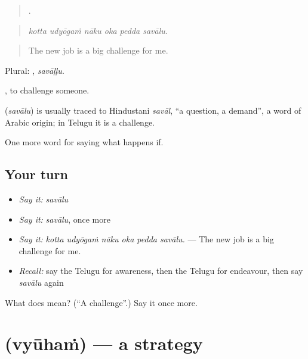 \begin{quote}
     .
\end{quote}

\begin{quote}
\emph{kotta udyōgaṁ nāku oka pedda savālu.}
\end{quote}

\begin{quote}
The new job is a big challenge for me.
\end{quote}

Plural: , \emph{savāḷḷu}.

 , to challenge someone.

\begin{cousinweb}
\textbf{} (\emph{savālu}) is usually traced to Hindustani \emph{savāl}, \textquotedblleft{}a question, a demand\textquotedblright{}, a word of Arabic origin; in Telugu it is a challenge.
\end{cousinweb}

\begin{grammarlens}[title={What you've built}]
One more word for saying what happens if.
\end{grammarlens}

\subsection*{Your turn}
\begin{itemize}
\raggedright
  \item \emph{Say it:} \emph{savālu}
  \item \emph{Say it:} \emph{savālu}, once more
  \item \emph{Say it:} \emph{kotta udyōgaṁ nāku oka pedda savālu.} — The new job is a big challenge for me.
  \item \emph{Recall:} say the Telugu for awareness, then the Telugu for endeavour, then say \emph{savālu} again
\end{itemize}

\begin{tcolorbox}[breakable,colback=teal!4,colframe=teal!35!black,title={Before you move on}]
What does  mean? (\textquotedblleft{}A challenge\textquotedblright{}.) Say it once more.
\end{tcolorbox}
\section[\texorpdfstring{\te{వ్యూహం} (vyūhaṁ)}{వ్యూహం (vyūhaṁ)}]{ (vyūhaṁ) — a strategy}

